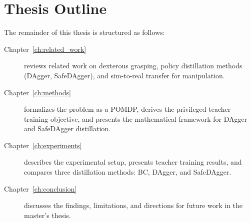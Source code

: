 \section{Thesis Outline}%
\label{sec:thesis_outline}%

The remainder of this thesis is structured as follows:

\begin{description}
    \item[Chapter~\ref{ch:related_work}] reviews related work on dexterous grasping, policy distillation methods (DAgger, SafeDAgger), and sim-to-real transfer for manipulation.
    \item[Chapter~\ref{ch:methods}] formalizes the problem as a \ac{POMDP}, derives the privileged teacher training objective, and presents the mathematical framework for DAgger and SafeDAgger distillation.
    \item[Chapter~\ref{ch:experiments}] describes the experimental setup, presents teacher training results, and compares three distillation methods: \ac{BC}, DAgger, and SafeDAgger.
    \item[Chapter~\ref{ch:conclusion}] discusses the findings, limitations, and directions for future work in the master's thesis.
\end{description}
%
